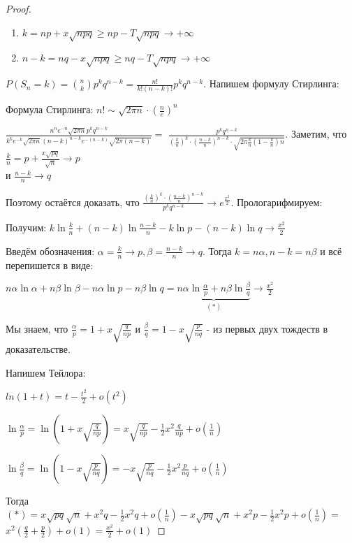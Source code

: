\begin{proof}
    \hfill \smallbreak
    \begin{enumerate}
        \item {
            $k = np + x\sqrt{npq} \geqslant np - T\sqrt{npq} \rightarrow +\infty$
        }
        \item {
            $n - k = nq - x\sqrt{npq} \geqslant nq - T\sqrt{npq} \rightarrow +\infty$
        }
    \end{enumerate}

    $P(S_n = k) = \binom{n}{k} p^k q^{n - k} = \frac{n!}{k!(n - k)!}p^k q^{n - k}$. Напишем формулу Стирлинга:

    Формула Стирлинга: $n! \sim \sqrt{2\pi n} \cdot \left(\frac{n}{e}\right)^{n}$

    $\frac{n^n e^{-n} \sqrt{2\pi n}p^kq^{n-k}}{k^ke^{-k}\sqrt{2\pi n} (n-k)^{n - k} e^{-(n - k)} \sqrt{2 \pi (n - k)}} =$
    $\frac{p^k q^{n - k}}{(\frac{k}{n})^k \cdot (\frac{n - k}{n})^{n - k} \cdot \sqrt{2 \pi \frac{k}{n} (1 - \frac{k}{n})n}}$.
    Заметим, что $\frac{k}{n} = p + \frac{x\sqrt{pq}}{\sqrt{n}} \rightarrow p$ \\ и $\frac{n - k}{n} \rightarrow q$

    Поэтому остаётся доказать, что $\frac{(\frac{k}{n})^k \cdot (\frac{n - k}{n})^{n - k}}{p^k q^{n - k}} \rightarrow e^{\frac{x^2}{2}}$. Прологарифмируем:

    Получим: $k \ln \frac{k}{n} + (n - k) \ln \frac{n - k}{n} - k \ln p - (n - k)\ln q \rightarrow \frac{x^2}{2}$

    Введём обозначения: $\alpha = \frac{k}{n} \rightarrow p, \beta = \frac{n - k}{n} \rightarrow q$. Тогда $k = n\alpha, n - k = n\beta$ и всё перепишется в виде:

    $n \alpha \ln \alpha + n \beta \ln \beta - n\alpha \ln p - n\beta \ln q = \underbrace{n\alpha \ln \frac{\alpha}{p} + n \beta \ln \frac{\beta}{q}}_{(*)} \rightarrow \frac{x^2}{2}$

    Мы знаем, что $\frac{\alpha}{p} = 1 + x\sqrt{\frac{q}{np}}$ и $\frac{\beta}{q} = 1 - x\sqrt{\frac{p}{nq}}$ - из первых двух тождеств в доказательстве.

    Напишем Тейлора:

    $ln(1+t) = t - \frac{t^2}{2} + o(t^2)$

    $\ln \frac{\alpha}{p} = \ln (1 + x\sqrt{\frac{q}{np}}) = x\sqrt{\frac{q}{np}} - \frac{1}{2}x^2\frac{q}{np} + o(\frac{1}{n}) $

    $\ln \frac{\beta}{q} = \ln (1 - x\sqrt{\frac{p}{nq}}) = -x\sqrt{\frac{p}{nq}} - \frac{1}{2}x^2 \frac{p}{nq} + o(\frac{1}{n})$

    Тогда $(*) = x\sqrt{pq}\sqrt{n} + x^2q - \frac{1}{2}x^2q + o(\frac{1}{n}) - x\sqrt{pq}\sqrt{n} + x^2p - \frac{1}{2}x^2p + o(\frac{1}{n}) = $
    $x^2 (\frac{q}{2} + \frac{p}{2}) + o(1) = \frac{x^2}{2} + o(1)$
\end{proof}

